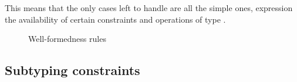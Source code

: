 This means that the only cases left to handle are all the simple
ones, expression the availability of certain constraints and
operations of type .


\begin{figure}





\caption{Well-formedness rules}
\label{fig:wf}
\end{figure}


\subsection{Subtyping constraints}


